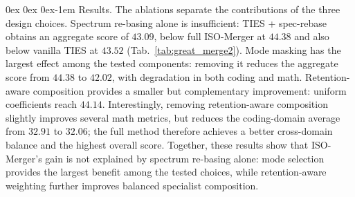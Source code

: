\documentclass[11pt, a4paper]{utda}
\makeatletter
\renewcommand{\paragraph}{%
  \@startsection{paragraph}{4}%
  {\z@}{0ex \@plus 0ex \@minus 0ex}{-1em}%
  {\normalfont\normalsize\bfseries}%
}
\theoremstyle{plain}
\theoremstyle{definition}
\theoremstyle{remark}
\makeatother
\begin{document}
\paragraph{Results.}
The ablations separate the contributions of the three design choices.
Spectrum re-basing alone is insufficient: TIES + spec-rebase obtains
an aggregate score of $43.09$, below full ISO-Merger at $44.38$
and also below vanilla TIES at $43.52$
(Tab.~\ref{tab:great_merge2}).
Mode masking has the largest effect among the tested components:
removing it reduces the aggregate score from $44.38$ to $42.02$,
with degradation in both coding and math.
Retention-aware composition provides a smaller but complementary
improvement: uniform coefficients reach $44.14$.
Interestingly, removing retention-aware composition slightly improves
several math metrics, but reduces the coding-domain average from
$32.91$ to $32.06$; the full method therefore achieves a better
cross-domain balance and the highest overall score.
Together, these results show that ISO-Merger's gain is not explained
by spectrum re-basing alone: mode selection provides the largest
benefit among the tested choices, while retention-aware weighting
further improves balanced specialist composition.
\end{document}
